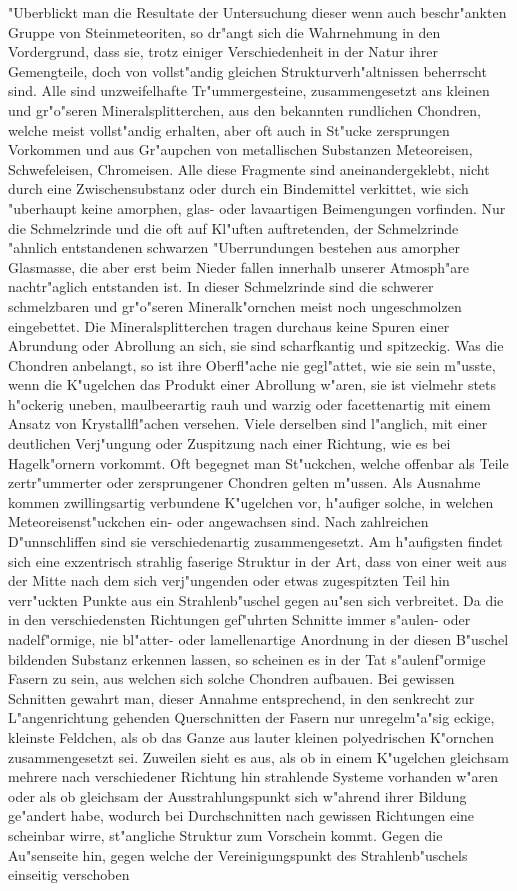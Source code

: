 \documentclass[a4paper, 11pt, oneside]{article}
\begin{document}
"Uberblickt man die Resultate der Untersuchung dieser wenn auch beschr"ankten Gruppe von Steinmeteoriten, so dr"angt sich die Wahrnehmung in den Vordergrund, dass sie, trotz einiger Verschiedenheit in der Natur ihrer Gemengteile, doch von vollst"andig gleichen Strukturverh"altnissen beherrscht sind. Alle sind unzweifelhafte Tr"ummergesteine, zusammengesetzt ans kleinen und gr"o"seren Mineralsplitterchen, aus den bekannten rundlichen Chondren, welche meist vollst"andig erhalten, aber oft auch in St"ucke zersprungen Vorkommen und aus Gr"aupchen von metallischen Substanzen Meteoreisen, Schwefeleisen, Chromeisen. Alle diese Fragmente sind aneinandergeklebt, nicht durch eine Zwischensubstanz oder durch ein Bindemittel verkittet, wie sich "uberhaupt keine amorphen, glas- oder lavaartigen Beimengungen vorfinden. Nur die Schmelzrinde und die oft auf Kl"uften auftretenden, der Schmelzrinde "ahnlich entstandenen schwarzen "Uberrundungen bestehen aus amorpher Glasmasse, die aber erst beim Nieder fallen innerhalb unserer Atmosph"are nachtr"aglich entstanden ist. In dieser Schmelzrinde sind die schwerer schmelzbaren und gr"o"seren Mineralk"ornchen meist noch ungeschmolzen eingebettet. Die Mineralsplitterchen tragen durchaus keine Spuren einer Abrundung oder Abrollung an sich, sie sind scharfkantig und spitzeckig. Was die Chondren anbelangt, so ist ihre Oberfl"ache nie gegl"attet, wie sie sein m"usste, wenn die K"ugelchen das Produkt einer Abrollung w"aren, sie ist vielmehr stets h"ockerig uneben, maulbeerartig rauh und warzig oder facettenartig mit einem Ansatz von Krystallfl"achen versehen. Viele derselben sind l"anglich, mit einer deutlichen Verj"ungung oder Zuspitzung nach einer Richtung, wie es bei Hagelk"ornern vorkommt. Oft begegnet man St"uckchen, welche offenbar als Teile zertr"ummerter oder zersprungener Chondren gelten m"ussen. Als Ausnahme kommen zwillingsartig verbundene K"ugelchen vor, h"aufiger solche, in welchen Meteoreisenst"uckchen ein- oder angewachsen sind. Nach zahlreichen D"unnschliffen sind sie verschiedenartig zusammengesetzt. Am h"aufigsten findet sich eine exzentrisch strahlig faserige Struktur in der Art, dass von einer weit aus der Mitte nach dem sich verj"ungenden oder etwas zugespitzten Teil hin verr"uckten Punkte aus ein Strahlenb"uschel gegen au"sen sich verbreitet. Da die in den verschiedensten Richtungen gef"uhrten Schnitte immer s"aulen- oder nadelf"ormige, nie bl"atter- oder lamellenartige Anordnung in der diesen B"uschel bildenden Substanz erkennen lassen, so scheinen es in der Tat s"aulenf"ormige Fasern zu sein, aus welchen sich solche Chondren aufbauen. Bei gewissen Schnitten gewahrt man, dieser Annahme entsprechend, in den senkrecht zur L"angenrichtung gehenden Querschnitten der Fasern nur unregelm"a"sig eckige, kleinste Feldchen, als ob das Ganze aus lauter kleinen polyedrischen K"ornchen zusammengesetzt sei. Zuweilen sieht es aus, als ob in einem K"ugelchen gleichsam mehrere nach verschiedener Richtung hin strahlende Systeme vorhanden w"aren oder als ob gleichsam der Ausstrahlungspunkt sich w"ahrend ihrer Bildung ge"andert habe, wodurch bei Durchschnitten nach gewissen Richtungen eine scheinbar wirre, st"angliche Struktur zum Vorschein kommt. Gegen die Au"senseite hin, gegen welche der Vereinigungspunkt des Strahlenb"uschels einseitig verschoben 
\end{document}
